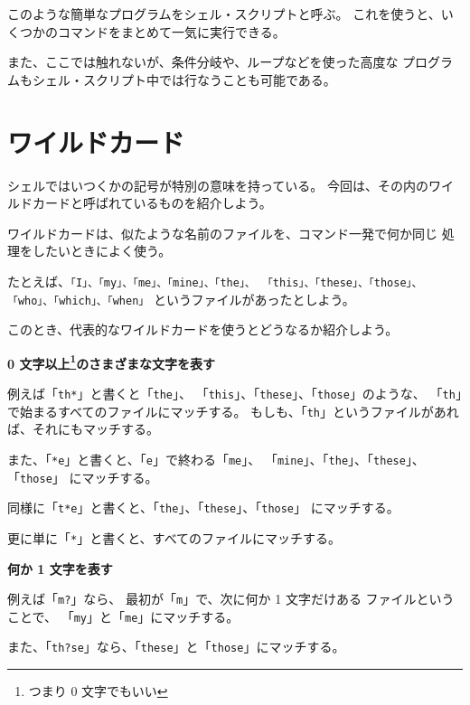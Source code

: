 このような簡単なプログラムをシェル・スクリプトと呼ぶ。
これを使うと、いくつかのコマンドをまとめて一気に実行できる。

また、ここでは触れないが、条件分岐や、ループなどを使った高度な
プログラムもシェル・スクリプト中では行なうことも可能である。

\section{ワイルドカード}

シェルではいつくかの記号が特別の意味を持っている。
今回は、その内のワイルドカードと呼ばれているものを紹介しよう。

ワイルドカードは、似たような名前のファイルを、コマンド一発で何か同じ
処理をしたいときによく使う。

たとえば、\texttt{「I」、「my」、「me」、「mine」、「the」、
「this」、「these」、「those」、「who」、「which」、「when」}
というファイルがあったとしよう。

このとき、代表的なワイルドカードを使うとどうなるか紹介しよう。

\begin{list}{}{
\setlength{\leftmargin}{1.5cm}
\setlength{\listparindent}{0cm}
\setlength{\itemindent}{0cm}
\setlength{\labelsep}{0.5cm}
\setlength{\labelwidth}{1cm}
}
\renewcommand{\makelabel}{\Large\tt}
\item[「\texttt{*}」] \textbf{0 文字以上\footnote{つまり 0 文字でもいい}のさまざまな文字を表す}

例えば「\texttt{th*}」と書くと「\texttt{the}」、
「\texttt{this}」、「\texttt{these}」、「\texttt{those}」のような、
「\texttt{th}」で始まるすべてのファイルにマッチする。
もしも、「\texttt{th}」というファイルがあれば、それにもマッチする。

また、「\texttt{*e}」と書くと、「\texttt{e}」で終わる「\texttt{me}」、
「\texttt{mine}」、「\texttt{the}」、「\texttt{these}」、「\texttt{those}」
にマッチする。

同様に「\texttt{t*e}」と書くと、「\texttt{the}」、「\texttt{these}」、「\texttt{those}」
にマッチする。

更に単に「\texttt{*}」と書くと、すべてのファイルにマッチする。

\item[「\texttt{?}」] \textbf{何か 1 文字を表す}

例えば「\texttt{m?}」なら、 最初が「\texttt{m}」で、次に何か 1 文字だけある
ファイルということで、
「\texttt{my}」と「\texttt{me}」にマッチする。

また、「\texttt{th?se}」なら、「\texttt{these}」と「\texttt{those}」にマッチする。
\end{list}

